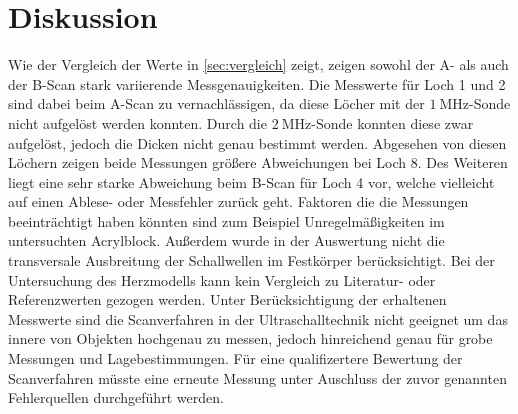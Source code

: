 \section{Diskussion}
\label{sec:Diskussion}
Wie der Vergleich der Werte in \ref{sec:vergleich} zeigt, zeigen sowohl der A- als auch der B-Scan stark variierende Messgenauigkeiten.
Die Messwerte für Loch 1 und 2 sind dabei beim A-Scan zu vernachlässigen, da diese Löcher mit der $\SI{1}{\mega\hertz}$-Sonde nicht aufgelöst werden konnten.
Durch die $\SI{2}{\mega\hertz}$-Sonde konnten diese zwar aufgelöst, jedoch die Dicken nicht genau bestimmt werden.
Abgesehen von diesen Löchern zeigen beide Messungen größere Abweichungen bei Loch 8. Des Weiteren liegt eine sehr starke Abweichung beim B-Scan für Loch 4 vor, welche vielleicht
auf einen Ablese- oder Messfehler zurück geht. Faktoren die die Messungen beeinträchtigt haben könnten sind zum Beispiel Unregelmäßigkeiten im untersuchten Acrylblock.
Außerdem wurde in der Auswertung nicht die transversale Ausbreitung der Schallwellen im Festkörper berücksichtigt. Bei der Untersuchung des Herzmodells kann kein Vergleich zu
Literatur- oder Referenzwerten gezogen werden. Unter Berücksichtigung der erhaltenen Messwerte sind die Scanverfahren in der Ultraschalltechnik nicht geeignet um das innere von
Objekten hochgenau zu messen, jedoch hinreichend genau für grobe Messungen und Lagebestimmungen. Für eine qualifizertere Bewertung der Scanverfahren müsste eine erneute Messung unter
Auschluss der zuvor genannten Fehlerquellen durchgeführt werden.
